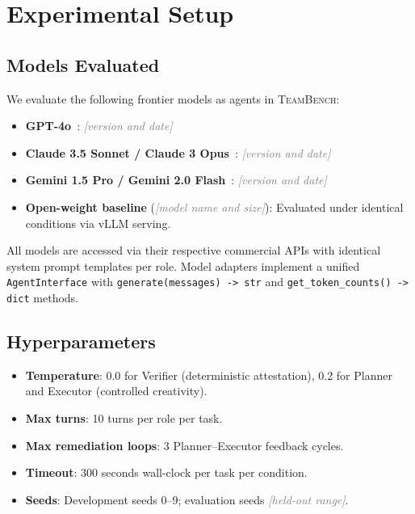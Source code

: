 \documentclass{article}
\newcommand{\teambench}{\textsc{TeamBench}}
\newcommand{\placeholder}[1]{\textcolor{gray}{\textit{[#1]}}}
\newcommand{\sys}[1]{\texttt{#1}}
\begin{document}
\section{Experimental Setup}
\label{sec:setup}

\subsection{Models Evaluated}
\label{sec:setup:models}

We evaluate the following frontier models as agents in \teambench{}:

\begin{itemize}
  \item \textbf{GPT-4o}~\cite{openai2023gpt4}: \placeholder{version and date}
  \item \textbf{Claude 3.5 Sonnet / Claude 3 Opus}~\cite{anthropic2024claude}:
        \placeholder{version and date}
  \item \textbf{Gemini 1.5 Pro / Gemini 2.0 Flash}~\cite{team2023gemini}:
        \placeholder{version and date}
  \item \textbf{Open-weight baseline} (\placeholder{model name and size}):
        Evaluated under identical conditions via vLLM serving.
\end{itemize}

All models are accessed via their respective commercial APIs with identical
system prompt templates per role. Model adapters implement a unified
\sys{AgentInterface} with \sys{generate(messages) -> str} and
\sys{get\_token\_counts() -> dict} methods.

\subsection{Hyperparameters}
\label{sec:setup:hyperparams}

\begin{itemize}
  \item \textbf{Temperature}: 0.0 for Verifier (deterministic attestation),
        0.2 for Planner and Executor (controlled creativity).
  \item \textbf{Max turns}: 10 turns per role per task.
  \item \textbf{Max remediation loops}: 3 Planner--Executor feedback cycles.
  \item \textbf{Timeout}: 300 seconds wall-clock per task per condition.
  \item \textbf{Seeds}: Development seeds 0--9; evaluation seeds
        \placeholder{held-out range}.
\end{itemize}
\end{document}

